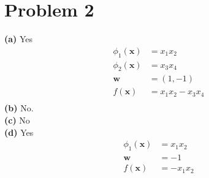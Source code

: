\documentclass[11pt]{scrartcl}
\begin{document}
\section*{Problem 2}
\textbf{(a)}
Yes\\
\begin{equation*}
\begin{aligned}
\phi_1 (\bm{x})&=x_1 x_2\\
\phi_2 (\bm{x})&=x_3 x_4\\
\bm{w}&=(1,-1)\\
f(\bm{x})&=x_1 x_2 - x_3 x_4\\
\end{aligned}
\end{equation*}
\textbf{(b)}
No.\\
\textbf{(c)}
No\\
\textbf{(d)}
Yes\\
\begin{equation*}
\begin{aligned}
\phi_1 (\bm{x})&=x_1 x_2\\
\bm{w}&=-1\\
f(\bm{x})&=- x_1 x_ 2\\
\end{aligned}
\end{equation*}
\end{document}
